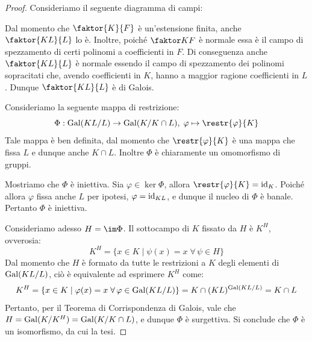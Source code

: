 \documentclass[11pt]{scrartcl}
\begin{document}
	\begin{proof}
		Consideriamo il seguente diagramma di campi:

		\begin{center}
		\end{center}
		
		Dal momento che $\faktor{K}{F}$ è un'estensione finita, anche
		$\faktor{KL}{L}$ lo è. Inoltre, poiché $\faktor KF$ è normale essa è il campo di spezzamento di
		certi polinomi a coefficienti in $F$. Di conseguenza anche $\faktor{KL}{L}$ è normale essendo il campo di spezzamento dei polinomi sopracitati che,
		avendo coefficienti in $K$, hanno a maggior ragione coefficienti in $L$. Dunque $\faktor{KL}{L}$ è di Galois. \medskip
		
		
		Consideriamo la seguente mappa di restrizione:
		\[ \Phi : \Gal(KL/L) \to \Gal(K/K \cap L), \; \varphi \mapsto \restr{\varphi}{K} \]
		Tale mappa è ben definita, dal momento che $\restr{\varphi}{K}$ è una
		mappa che fissa $L$ e dunque anche $K \cap L$. Inoltre $\Phi$ è chiaramente
		un omomorfismo di gruppi. \medskip
		
		
		Mostriamo che $\Phi$ è iniettiva. Sia $\varphi \in \ker \Phi$, allora
		$\restr{\varphi}{K} = \id_K$. Poiché allora $\varphi$ fissa anche
		$L$ per ipotesi, $\varphi = \mathrm{id}_{KL}$, e dunque il nucleo di
		$\Phi$ è banale. Pertanto $\Phi$ è iniettiva. \medskip
		
		
		Consideriamo adesso $H = \im \Phi$. Il sottocampo di $K$ fissato
		da $H$ è $K^H$, ovverosia:
		\[ K^H = \{x \in K \mid \psi(x) = x \; \forall \, \psi \in H \} \]
		Dal momento che $H$ è formato da tutte le restrizioni a $K$ degli
		elementi di $\operatorname{Gal}(KL/L)$, ciò è equivalente ad esprimere $K^H$
		come:
		\begin{multline*}
			 K^H = \{x \in K \mid \varphi(x) = x \; \forall \, \varphi \in \operatorname{Gal}(KL/L)\} =
			 K \cap (KL)^{\operatorname{Gal}(KL/L)} = K \cap L
		\end{multline*}
		Pertanto, per il Teorema di Corrispondenza di Galois, vale che $H = \operatorname{Gal}(K/K^H) = \operatorname{Gal}(K/K \cap L)$, e dunque $\Phi$ è surgettiva. Si conclude che $\Phi$ è
		un isomorfismo, da cui la tesi.
	\end{proof}
	
\end{document}
